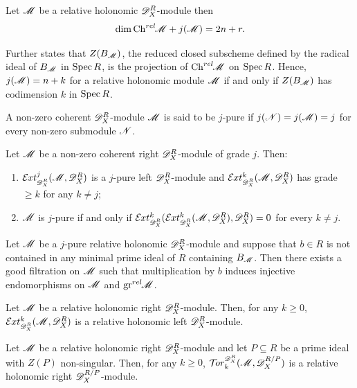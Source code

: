 \begin{proposition}{\cite[Lemma 3.4.1]{budur2020zeroI}}\label{prop: ChrelGrades}
  Let $\mathscr{M}$ be a relative holonomic $\mathscr{D}_X^R$-module then
  $$\dim \operatorname{Ch}^{rel}\mkern-5mu \mathscr{M} + j(\mathscr{M}) = 2n + r.$$
\end{proposition}
\begin{remark}\label{rem: GradeIFFBernsteinIdeal}
  Further \cite[Lemma 3.2.2]{budur2020zeroI} states that $Z(B_{\mathscr{M}})$, the reduced closed subscheme defined by the radical ideal of $B_{\mathscr{M}}$ in $\operatorname{Spec} R$, is the projection of $\operatorname{Ch}^{rel}\mkern-5mu\mathscr{M}$ on $\operatorname{Spec} R$.
  Hence, $j(\mathscr{M})=n+k$ for a relative holonomic module $\mathscr{M}$ if and only if $Z(B_{\mathscr{M}})$  has codimension $k$ in $\operatorname{Spec} R$.
  \end{remark}
\begin{definition}
  A non-zero coherent $\mathscr{D}_X^R$-module $\mathscr{M}$ is said to be $j$-pure if $j(\mathscr{N}) = j(\mathscr{M}) = j$ for every non-zero submodule $\mathscr{N}$.
\end{definition}
\begin{proposition}{\cite[Lemma 4.3.5.]{budur2020zeroI}}\label{prop: JPureExt}
   Let $\mathscr{M}$ be a non-zero coherent right $\mathscr{D}_X^R$-module of grade $j$. Then:
\begin{enumerate}
\item    $\Ex{\D_X^R}{j}(\M,\D_X^R)$ is a $j$-pure left $\mathscr{D}_X^R$-module and $\Ex{\D_X^R}{k}(\M,\D_X^R)$ has grade $\ge k$ for any $k\neq j$;
\item $\mathscr{M}$ is $j$-pure if and only if $\Ex{\D_X^R}{k}(\Ex{\D_X^R}{k}(\M,\D_X^R),\D_X^R)= 0$ for every $k\neq j$.
\end{enumerate}
 \end{proposition}
 \begin{proposition}{\cite[Lemma 3.4.2]{budur2020zeroI}}\label{prop: Injective3.4.2}
   Let $\mathscr{M}$ be a $j$-pure relative holonomic $\mathscr{D}_X^R$-module and suppose that $b\in R$ is not contained in any minimal prime ideal of $R$ containing $B_{\mathscr{M}}$. Then there exists a good filtration on $\mathscr{M}$ such that multiplication by $b$ induces injective endomorphisms on $\mathscr{M}$ and $\operatorname{gr}^{rel}\mkern-5mu\mathscr{M}$.
 \end{proposition}
 \begin{proposition}{\cite[Lemma 3.2.4.]{budur2020zeroI}}
   Let $\mathscr{M}$ be a relative holonomic right $\mathscr{D}_X^R$-module. Then, for any $k\geq 0$, $\Ex{\D_X^R}{k}(\M,\D_X^R)$ is a relative holonomic left $\mathscr{D}_X^R$-module.
 \end{proposition}
 \begin{proposition}\label{prop: TorRelHol}
   Let $\mathscr{M}$ be a relative holonomic right $\mathscr{D}_X^R$-module and let $P\subseteq R$ be a prime ideal with $Z(P)$ non-singular. Then, for any $k\geq 0$, $\Tr{\D_X^R}{k}(\M,\D_X^{R/P})$ is a relative holonomic right $\mathscr{D}_X^{R/P}$-module.
 \end{proposition}
